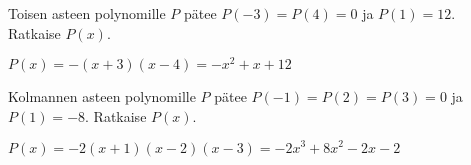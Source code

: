 \begin{tehtavasivu}
\begin{tehtava}
    Toisen asteen polynomille $P$ pätee $P(-3)=P(4)=0$ ja $P(1)=12$. Ratkaise $P(x)$.
    \begin{vastaus}
        $P(x)=-(x+3)(x-4)=-x^2+x+12$
    \end{vastaus}
\end{tehtava}

\begin{tehtava}
    Kolmannen asteen polynomille $P$ pätee $P(-1)=P(2)=P(3)=0$ ja $P(1)=-8$. Ratkaise $P(x)$.
    \begin{vastaus}
        $P(x)=-2(x+1)(x-2)(x-3)=-2x^3+8x^2-2x-2$
    \end{vastaus}
\end{tehtava}

\end{tehtavasivu}
